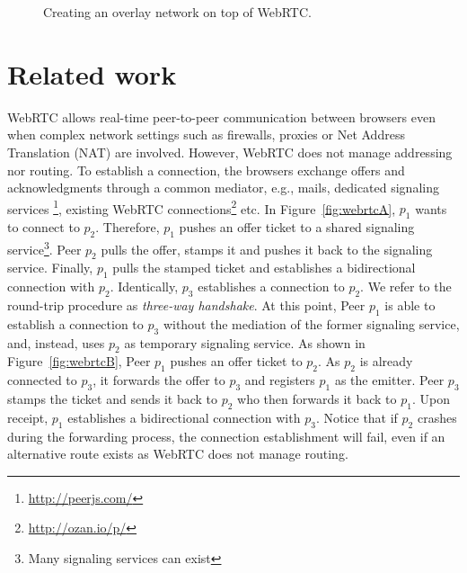 
\begin{figure*}
\centering
{}
\hspace{5pt}
\hspace{5pt}
\caption{\label{fig:webrtc}Creating an overlay network on top of WebRTC.}
\end{figure*}


\section{Related work}
\label{sec:relatedwork}


WebRTC allows real-time peer-to-peer communication between browsers even when
complex network settings such as firewalls, proxies or Net Address Translation
(NAT) are involved. However, WebRTC does not manage addressing nor routing. To
establish a connection, the browsers exchange offers and acknowledgments
through a common mediator, e.g., mails, dedicated signaling services
\footnote{\url{http://peerjs.com/}}, existing WebRTC
connections\footnote{\url{http://ozan.io/p/}} etc. In
Figure~\ref{fig:webrtcA}, $p_1$ wants to connect to $p_2$. Therefore, $p_1$
pushes an offer ticket to a shared signaling service\footnote{Many signaling
  services can exist}. Peer $p_2$ pulls the offer, stamps it and pushes it back
to the signaling service. Finally, $p_1$ pulls the stamped ticket and
establishes a bidirectional connection with $p_2$.  Identically, $p_3$
establishes a connection to $p_2$. We refer to the round-trip procedure as
\emph{three-way handshake}. At this point, Peer $p_1$ is able to establish a
connection to $p_3$ without the mediation of the former signaling service, and,
instead, uses $p_2$ as temporary signaling service.  As shown in
Figure~\ref{fig:webrtcB}, Peer $p_1$ pushes an offer ticket to $p_2$. As
$p_2$ is already connected to $p_3$, it forwards the offer to $p_3$ and
registers $p_1$ as the emitter. Peer $p_3$ stamps the ticket and sends it back
to $p_2$ who then forwards it back to $p_1$. Upon receipt, $p_1$ establishes a
bidirectional connection with $p_3$.  Notice that if $p_2$ crashes during the
forwarding process, the connection establishment will fail, even if an
alternative route exists as WebRTC does not manage routing.

